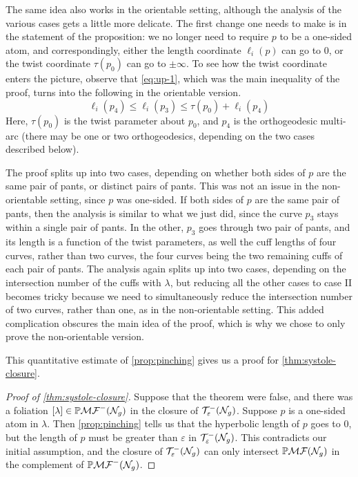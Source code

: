 \begin{remark}
  The same idea also works in the orientable setting, although the analysis of the various cases gets a little more delicate.
  The first change one needs to make is in the statement of the proposition: we no longer need to require $p$ to be a one-sided atom, and correspondingly, either the length coordinate $\ell_i(p)$ can go to $0$, or the twist coordinate $\tau(p_0)$ can go to $\pm \infty$.
  To see how the twist coordinate enters the picture, observe that \eqref{eq:up-1}, which was the main inequality of the proof, turns into the following in the orientable version.
  \begin{equation}
    \label{eq:up-11}
    \ell_i(p_4)  \leq \ell_i(p_3) \leq \tau(p_0) + \ell_i(p_4)
  \end{equation}
  Here, $\tau(p_0)$ is the twist parameter about $p_0$, and $p_4$ is the orthogeodesic multi-arc (there may be one or two orthogeodesics, depending on the two cases described below).

  The proof splits up into two cases, depending on whether both sides of $p$ are the same pair of pants, or distinct pairs of pants.
  This was not an issue in the non-orientable setting, since $p$ was one-sided.
  If both sides of $p$ are the same pair of pants, then the analysis is similar to what we just did, since the curve $p_3$ stays within a single pair of pants.
  In the other, $p_3$ goes through two pair of pants, and its length is a function of the twist parameters, as well the cuff lengths of four curves, rather than two curves, the four curves being the two remaining cuffs of each pair of pants.
  The analysis again splits up into two cases, depending on the intersection number of the cuffs with $\lambda$, but reducing all the other cases to case II becomes tricky because we need to simultaneously reduce the intersection number of two curves, rather than one, as in the non-orientable setting.
  This added complication obscures the main idea of the proof, which is why we chose to only prove the non-orientable version.
\end{remark}

This quantitative estimate of \autoref{prop:pinching} gives us a proof for \autoref{thm:systole-closure}.
\begin{proof}[Proof of \autoref{thm:systole-closure}]
  Suppose that the theorem were false, and there was a foliation $[\lambda] \in \mathbb{P}\mathcal{MF}^-(\mathcal{N}_g)$ in the closure of $\mathcal{T}_{\varepsilon}^{-}(\mathcal{N}_g)$.
  Suppose $p$ is a one-sided atom in $\lambda$.
  Then \autoref{prop:pinching} tells us that the hyperbolic length of $p$ goes to $0$, but the length of $p$ must be greater than $\varepsilon$ in $\mathcal{T}_{\varepsilon}^{-}(\mathcal{N}_g)$.
  This contradicts our initial assumption, and the closure of $\mathcal{T}_{\varepsilon}^{-}(\mathcal{N}_g)$ can only intersect $\mathbb{P}\mathcal{MF}(\mathcal{N}_g)$ in the complement of $\mathbb{P}\mathcal{MF}^-(\mathcal{N}_g)$.
\end{proof}

